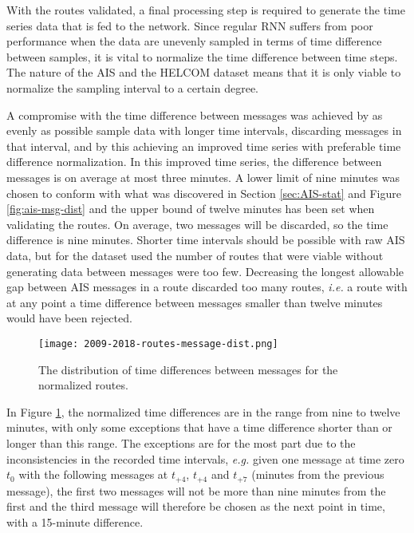 \documentclass[../main.tex]{subfiles}
\begin{document}
With the routes validated, a final processing step is required to generate the time series data that is fed to the network. Since regular RNN suffers from poor performance when the data are unevenly sampled in terms of time difference between samples, it is vital to normalize the time difference between time steps. The nature of the AIS and the HELCOM dataset means that it is only viable to normalize the sampling interval to a certain degree.

A compromise with the time difference between messages was achieved by as evenly as possible sample data with longer time intervals, discarding messages in that interval, and by this achieving an improved time series with preferable time difference normalization. In this improved time series, the difference between messages is on average at most three minutes. A lower limit of nine minutes was chosen to conform with what was discovered in Section \ref{sec:AIS-stat} and Figure \ref{fig:ais-msg-dist} and the upper bound of twelve minutes has been set when validating the routes. On average, two messages will be discarded, so the time difference is nine minutes. Shorter time intervals should be possible with raw AIS data, but for the dataset used the number of routes that were viable without generating data between messages were too few. Decreasing the longest allowable gap between AIS messages in a route discarded too many routes, \textit{i.e.} a route with at any point a time difference between messages smaller than twelve minutes would have been rejected.

\begin{figure}[H]
	\centering
	\texttt{[image: 2009-2018-routes-message-dist.png]}
	\caption{The distribution of time differences between messages for the normalized routes.}
	\label{fig:norm-time}
\end{figure}

In Figure \ref{fig:norm-time}, the normalized time differences are in the range from nine to twelve minutes, with only some exceptions that have a time difference shorter than or longer than this range. The exceptions are for the most part due to the inconsistencies in the recorded time intervals, \textit{e.g.} given one message at time zero $t_0$ with the following messages at $t_{+4}$, $t_{+4}$ and $t_{+7}$ (minutes from the previous message), the first two messages will not be more than nine minutes from the first and the third message will therefore be chosen as the next point in time, with a 15-minute difference. 
\end{document}
